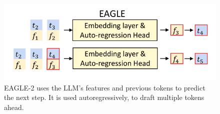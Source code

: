\begin{figure}[h]
	\centering
	\includegraphics[width=0.7\linewidth]{fig/EAGLE_model.png}
	\caption{EAGLE-2 uses the LLM's \textcolor{orange-ish}{features} and previous \textcolor{blue-ish}{tokens} to predict the next step. It is used autoregressively, to draft multiple tokens ahead. \cite{li2024eagle}}
	\label{fig:EAGLE_model}
  \end{figure}
